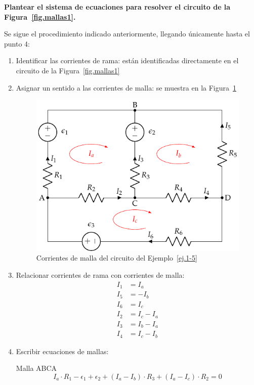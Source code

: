 \documentclass[11pt]{book} %
\begin{document}
	\begin{example}
		\label{ej.1-5}
		\textbf{Plantear el sistema de ecuaciones para resolver el circuito de la Figura~\ref{fig.mallas1}.}
		
		Se sigue el procedimiento indicado anteriormente, llegando únicamente hasta el punto 4: 
		\begin{enumerate}
			\item Identificar las corrientes de rama: están identificadas directamente en el circuito de la Figura~\ref{fig.mallas1}
			\item Asignar un sentido a las corrientes de malla: se muestra en la Figura~\ref{fig.mallas1_corrientes}
			\begin{figure}[H]
				\centering
				\includegraphics{../figs/mallas1_corrientes.pdf}
				\caption{Corrientes de malla del circuito del Ejemplo~\ref{ej.1-5}}
				\label{fig.mallas1_corrientes}
			\end{figure}
			\item Relacionar corrientes de rama con corrientes de malla:
			\begin{align*}
				I_1 &= I_a\\
				I_5 &= -I_b\\
				I_6 &= I_c\\
				I_2 &= I_c -I_a\\
				I_3 &= I_b - I_a\\
				I_4 &= I_c - I_b
			\end{align*}
			\item Escribir ecuaciones de mallas: 
			
			Malla ABCA
			\begin{equation*}
				I_a \cdot R_1 - \epsilon_1 + \epsilon_2 + (I_a - I_b) \cdot R_3 + (I_a - I_c) \cdot R_2 = 0
			\end{equation*}
			

\end{enumerate}
\end{example}
\end{document}
